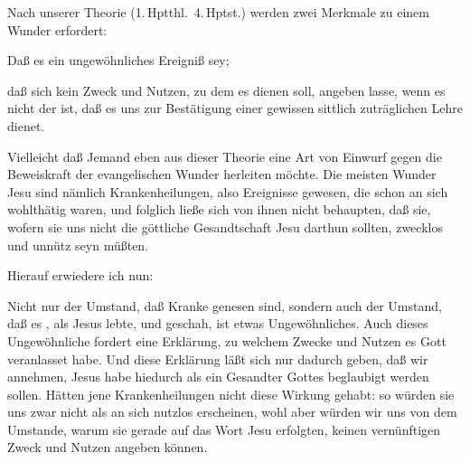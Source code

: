 \begin{aufza}\setcounter{enumi}{1}
\item Nach unserer Theorie (1.\,Hptthl.\ 4.\,Hptst.) werden zwei Merkmale zu einem Wunder erfordert:
\begin{aufzb}
\item Daß es ein ungewöhnliches Ereigniß sey;
\item daß sich kein Zweck und Nutzen, zu dem es dienen soll, angeben lasse, wenn es nicht der ist, daß es uns zur Bestätigung einer gewissen sittlich zuträglichen Lehre dienet.
\end{aufzb}
\end{aufza}
Vielleicht daß Jemand eben aus dieser Theorie eine Art von Einwurf gegen die Beweiskraft der evangelischen Wunder herleiten möchte. Die meisten Wunder Jesu sind nämlich Krankenheilungen, also Ereignisse gewesen, die schon an sich wohlthätig waren, und folglich ließe sich von ihnen nicht behaupten, daß sie, wofern sie uns nicht die göttliche Gesandtschaft Jesu darthun sollten, zwecklos und unnütz seyn müßten.\par
Hierauf erwiedere ich nun:\par
Nicht nur der Umstand, daß Kranke genesen sind, sondern auch der Umstand, daß es , als Jesus lebte, und  geschah, ist etwas Ungewöhnliches. Auch dieses Ungewöhnliche fordert eine Erklärung, zu welchem Zwecke und Nutzen es Gott veranlasset habe. Und diese Erklärung läßt sich nur dadurch geben, daß wir annehmen, Jesus habe hiedurch als ein Gesandter Gottes beglaubigt werden sollen. Hätten jene Krankenheilungen nicht diese Wirkung gehabt: so würden sie uns zwar nicht als an sich nutzlos erscheinen, wohl aber würden wir uns von dem Umstande, warum sie gerade auf das Wort Jesu erfolgten, keinen vernünftigen Zweck und Nutzen angeben können.~


